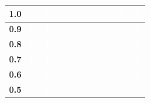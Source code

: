 \documentclass[fleqn,usenatbib]{mnras}
\begin{document}
\begin{table}
\centering
\begin{tabular}{|c|c|c|c|c|c|c|c|c|} 
    \hline
    \textbf{1.0} &
    \cellcolor{blue}\textcolor{white}{P} & 
    \cellcolor{blue}\textcolor{white}{P} &
    \cellcolor{red}\textcolor{white}{L} &
    \cellcolor{blue}\textcolor{white}{P} & 
    \cellcolor{blue}\textcolor{white}{P} & 
    \cellcolor{blue}\textcolor{white}{P} & 
    \cellcolor{blue}\textcolor{white}{P} & 
    \cellcolor{blue}\textcolor{white}{P} \\ 
    \hline
    \textbf{0.9} & 
    \cellcolor{blue}\textcolor{white}{P} & 
    \cellcolor{blue}\textcolor{white}{P} & 
    \cellcolor{red}\textcolor{white}{L} &
    \cellcolor{red}\textcolor{white}{L} & 
    \cellcolor{blue}\textcolor{white}{P} & 
    \cellcolor{blue}\textcolor{white}{P} & 
    \cellcolor{blue}\textcolor{white}{P} & 
    \cellcolor{blue}\textcolor{white}{P} \\ 
    \hline
    \textbf{0.8} & 
    \cellcolor{blue}\textcolor{white}{P} & 
    \cellcolor{blue}\textcolor{white}{P} & 
    \cellcolor{red}\textcolor{white}{L} &
    \cellcolor{red}\textcolor{white}{L} & 
    \cellcolor{blue}\textcolor{white}{P} &
    \cellcolor{blue}\textcolor{white}{P} &
    \cellcolor{blue}\textcolor{white}{P} &
    \cellcolor{blue}\textcolor{white}{P} \\ 
    \hline
    \textbf{0.7} & 
    \cellcolor{blue}\textcolor{white}{P} &
    \cellcolor{blue}\textcolor{white}{P} &
    \cellcolor{red}\textcolor{white}{L} & 
    \cellcolor{red}\textcolor{white}{L} & 
    \cellcolor{blue}\textcolor{white}{P} & 
    \cellcolor{blue}\textcolor{white}{P} & 
    \cellcolor{blue}\textcolor{white}{P} & 
    \cellcolor{blue}\textcolor{white}{P} \\ 
    \hline
    \textbf{0.6} & 
    \cellcolor{blue}\textcolor{white}{P} & 
    \cellcolor{blue}\textcolor{white}{P} & 
    \cellcolor{red}\textcolor{white}{L} & 
    \cellcolor{red}\textcolor{white}{L} & 
    \cellcolor{blue}\textcolor{white}{P} & 
    \cellcolor{red}\textcolor{white}{L} & 
    \cellcolor{blue}\textcolor{white}{P} & 
    \cellcolor{blue}\textcolor{white}{P} \\ 
    \hline
    \textbf{0.5} & 
    \cellcolor{blue}\textcolor{white}{P} & 
    \cellcolor{blue}\textcolor{white}{P} & 
    \cellcolor{red}\textcolor{white}{L} & 
    \cellcolor{red}\textcolor{white}{L} & 
    \cellcolor{red}\textcolor{white}{L} & 
    \cellcolor{red}\textcolor{white}{L} & 

\end{tabular}
\end{table}
\end{document}

